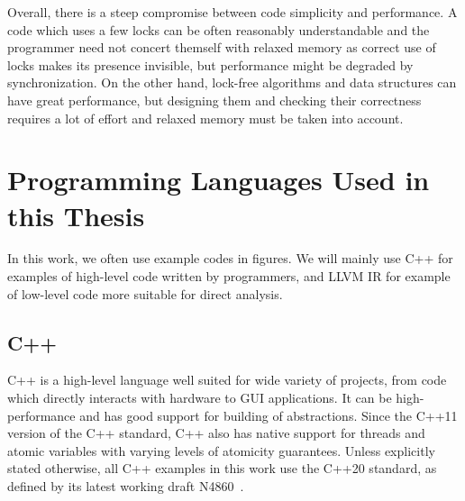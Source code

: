 Overall, there is a steep compromise between code simplicity and performance.
A code which uses a few locks can be often reasonably understandable and the
programmer need not concert themself with relaxed memory as correct use of
locks makes its presence invisible, but performance might be degraded by
synchronization.
On the other hand, lock-free algorithms and data structures can have great
performance, but designing them and checking their correctness requires a lot
of effort and relaxed memory must be taken into account.

% 


\section{Programming Languages Used in this Thesis}

In this work, we often use example codes in figures.
We will mainly use C++ for examples of high-level code written by programmers,
and LLVM IR for example of low-level code more suitable for direct analysis.

\subsection{C++}

C++ is a high-level language well suited for wide variety of projects, from
code which directly interacts with hardware to GUI applications.
It can be high-performance and has good support for building of abstractions.
Since the C++11 version of the C++ standard, C++ also has native support for
threads and atomic variables with varying levels of atomicity guarantees.
Unless explicitly stated otherwise, all C++ examples in this work use the C++20
standard, as defined by its latest working draft N4860~\cite{cpp20}.

